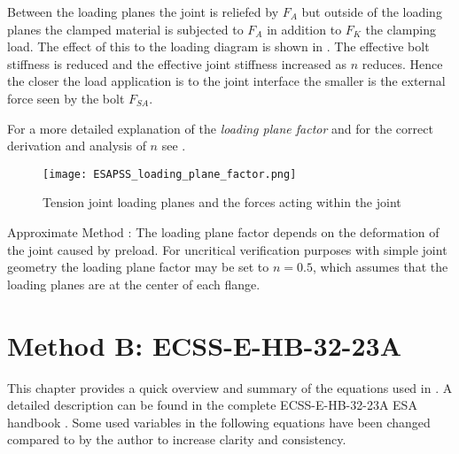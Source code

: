 Between the loading planes the joint is reliefed by $F_A$ but outside of the loading planes the clamped
material is subjected to $F_A$ in addition to $F_K$ the clamping load. The effect of this to the loading 
diagram is shown in . The effective bolt stiffness is reduced and the 
effective joint stiffness increased as $n$ reduces. Hence the closer the load application is to the 
joint interface the smaller is the external force seen by the bolt $F_{SA}$. 

For a more detailed explanation of the \emph{loading plane factor} and for the correct derivation
and analysis of $n$ see \cite{VDI2230_1,ECSS_HB_32_23A}.
\begin{figure}[!htpb]
  \centering
  \texttt{[image: ESAPSS\_loading\_plane\_factor.png]}
  \caption{Tension joint loading planes and the forces acting within the joint \cite{ESAPSS}}
  \label{fig:esapss_lpf_1}
\end{figure}
\begin{colbox}{Approximate Method \cite{ECSS_HB_32_23A}:}
  The loading plane factor depends on the deformation of the joint caused by preload. For uncritical
  verification purposes with simple joint geometry the loading plane factor may be set to $n=0.5$,
  which assumes that the loading planes are at the center of each flange.
\end{colbox}

\chapter{Method B: ECSS-E-HB-32-23A}
This chapter provides a quick overview and summary of the equations used in \bat. A detailed description
can be found in the complete ECSS-E-HB-32-23A ESA handbook \cite{ECSS_HB_32_23A}. Some used variables
in the following equations have been changed compared to \cite{ECSS_HB_32_23A} by the author to increase
clarity and consistency.

